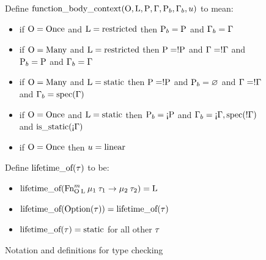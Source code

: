\begin{figure}
\begin{flushleft}
{Define $\textrm{function\_body\_context}(\textrm{O}, \textrm{L}, \textrm{P}, \Gamma, \textrm{P}_b, \Gamma_b, u)$ to mean:
\begin{itemize}
\item if $\textrm{O} = \textrm{Once}$ and $\textrm{L} = \textrm{restricted}$ then $\textrm{P}_b = \textrm{P}$ and $\Gamma_b = \Gamma$
\item if $\textrm{O} = \textrm{Many}$ and $\textrm{L} = \textrm{restricted}$ then $\textrm{P} = !\textrm{P}$ and $\Gamma = !\Gamma$ and $\textrm{P}_b = \textrm{P}$ and $\Gamma_b = \Gamma$
\item if $\textrm{O} = \textrm{Many}$ and $\textrm{L} = \textrm{static}$ then $\textrm{P} = !\textrm{P}$ and $\textrm{P}_b = \varnothing$ and $\Gamma = !\Gamma$ and $\Gamma_b = \textrm{spec}(\Gamma)$
\item if $\textrm{O} = \textrm{Once}$ and $\textrm{L} = \textrm{static}$ then $\textrm{P}_b = \text{!`}\textrm{P}$ and $\Gamma_b = \text{!`}\Gamma, \textrm{spec}(!\Gamma)$ and $\textrm{is\_static}(\text{!`}\Gamma)$
\item if $\textrm{O} = \textrm{Once}$ then $u = \textrm{linear}$
\end{itemize}

Define $\textrm{lifetime\_of}(\tau)$ to be:
\begin{itemize}
  \item $\textrm{lifetime\_of}(\textrm{Fn}^{m}_{\textrm{O}\: \textrm{L}}\: \mu_1\:\tau_1\rightarrow \mu_2\:\tau_2) = \textrm{L}$
  \item $\textrm{lifetime\_of}(\textrm{Option}(\tau)) = \textrm{lifetime\_of}(\tau)$
  \item $\textrm{lifetime\_of}(\tau) = \textrm{static}$ for all other $\tau$
\end{itemize}
}
\end{flushleft}
\vspace{-2mm}
\caption{Notation and definitions for type checking}
\label{fig:formal:typingdefs}
\end{figure}












